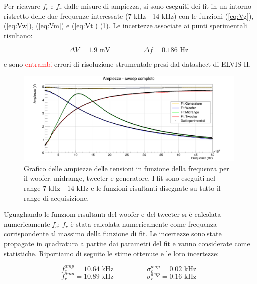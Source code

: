 \documentclass[12pt,italian]{article}
\newcommand{\err}[1]{\textcolor{red}{#1}}
\begin{document}
Per ricavare $f_{c}$ e $f_{r}$ dalle misure di ampiezza, si sono eseguiti dei
fit in un intorno ristretto delle due frequenze interessate ($ 7 $ kHz - $ 14 $
kHz) con le funzioni (\ref{eq:Vg}), (\ref{eq:Vw}), (\ref{eq:Vm}) e
(\ref{eq:Vt}) (\cref{fig:amp_sweep}). Le incertezze associate ai punti
sperimentali risultano:

\begin{equation*}
	\Delta V = 1.9 \text{ mV} \hspace{2cm} \Delta f = 0.186 \text{ Hz}
\end{equation*}

\noindent
e sono \err{entrambi} errori di risoluzione strumentale presi dal datasheet di ELVIS
II.

\begin{figure}[h]
	\centering
	\includegraphics[width=\textwidth]{fig_amp.png}
	\caption{Grafico delle ampiezze delle tensioni in funzione della frequenza per il woofer, midrange, tweeter e generatore. I fit sono eseguiti nel range $7$ kHz - $14$ kHz e le funzioni risultanti disegnate su tutto il range di acquisizione.}\label{fig:fc_fr}
	\label{fig:amp_sweep}
\end{figure}

Uguagliando le funzioni risultanti del woofer e del tweeter si è calcolata
numericamente $f_{c}$; $f_{r}$ è stata calcolata numericamente come frequenza
corrispondente al massimo della funzione di fit. Le incertezze sono state
propagate in quadratura a partire dai parametri del fit e vanno considerate
come statistiche. Riportiamo di seguito le stime ottenute e le loro incertezze:

\begin{equation*}
	f_{c}^{amp} = 10.64 \text{ kHz} \hspace{2cm} \sigma_c^{amp} = 0.02 \text{ kHz}
\end{equation*}
\begin{equation*}
	f_{r}^{amp} = 10.89 \text{ kHz} \hspace{2cm} \sigma_r^{amp} = 0.16 \text{ kHz}
\end{equation*}
\end{document}

